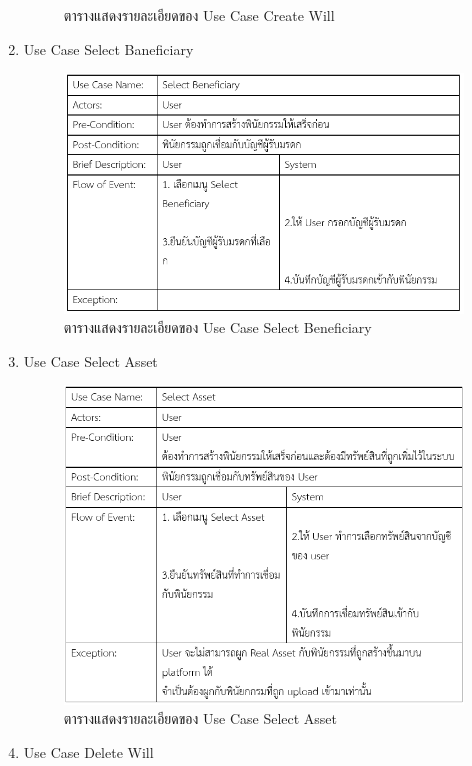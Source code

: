 \documentclass[12pt,oneside,openright,a4paper]{cpe-thai-project}
\begin{document}
\begin{enumerate}[label=\thesubsection.\arabic*,leftmargin=0pt,itemindent=2.5cm]
\begin{figure}[!htb]
		\caption{ตารางแสดงรายละเอียดของ Use Case Create Will}
	\end{figure}
	\FloatBarrier
\item Use Case Select Baneficiary
	\begin{figure}[!htb]
		\centering
		\includegraphics[scale=0.8]{usecaseselectbenaficiary}
		\caption{ตารางแสดงรายละเอียดของ Use Case Select Beneficiary}
	\end{figure}
	\FloatBarrier
\item Use Case Select Asset
	\begin{figure}[!htb]
		\centering
		\includegraphics[scale=0.8]{selectAsset}
		\caption{ตารางแสดงรายละเอียดของ Use Case Select Asset}
	\end{figure}
	\FloatBarrier
\item Use Case Delete Will
	\begin{figure}[!htb]

\end{figure}
\end{enumerate}
\end{document}
